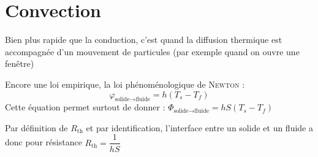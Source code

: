 \documentclass[11pt,a4paper,fleqn,pdftex]{report}
\begin{document}
\section{Convection}
Bien plus rapide que la conduction, c'est quand la diffusion thermique est accompagnée d'un mouvement de particules (par exemple quand on ouvre une fenêtre)
\begin{dfn}
Encore une loi empirique, la loi phénoménologique de \textsc{Newton} :
\begin{equation}
\varphi_{{\text{solide}\to\text{fluide}}}= h(T_s - T_f) 
\end{equation}
Cette équation permet surtout de donner : 
$\boxed{\Phi_{{\text{solide}\to\text{fluide}}} = h S (T_s - T_f)}$
\end{dfn}
Par définition de $R_{\text{th}}$ et par identification, l'interface entre un solide et un fluide a donc pour résistance $R_{\text{th}} = \dfrac{1}{h S}$
\end{document}
